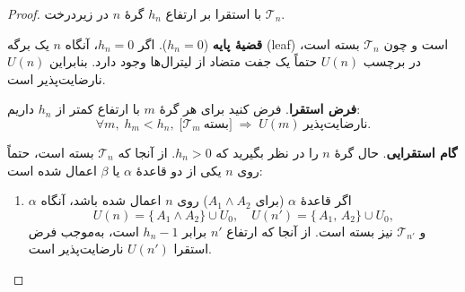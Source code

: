   \begin{proof}
  با استقرا بر ارتفاع \(h_n\) گرهٔ \(n\) در زیر‌درخت \(\mathscr{T}_n\).
  
  \textbf{قضیهٔ پایه} (\(h_n = 0\)).  
  اگر \(h_n=0\)، آنگاه \(n\) یک برگه (leaf) است و چون \(\mathscr{T}_n\) بسته است، در برچسب \(U(n)\) حتماً یک جفت متضاد از لیترال‌ها وجود دارد. بنابراین \(U(n)\) نارضایت‌پذیر است.
  
  \textbf{فرض استقرا}.  
  فرض کنید برای هر گرهٔ \(m\) با ارتفاع کمتر از \(h_n\) داریم:
  \[
  \forall m,\;h_m < h_n,\;\bigl[\mathscr{T}_m\ \text{بسته}\bigr]\;\Longrightarrow\;U(m)\ \text{نارضایت‌پذیر}.
  \]
  
  \textbf{گام استقرایی}.  
  حال گرهٔ \(n\) را در نظر بگیرید که \(h_n>0\). از آنجا که \(\mathscr{T}_n\) بسته است، حتماً روی \(n\) یکی از دو قاعدهٔ \(\alpha\) یا \(\beta\) اعمال شده است:
  \begin{center}
    \begin{latin}
    \hfill
    \end{latin}
  \end{center}
  \begin{enumerate}[1)]
    \item \(\alpha\)\;  
      اگر قاعدهٔ \(\alpha\) (برای \(A_1\land A_2\)) روی \(n\) اعمال شده باشد، آنگاه
      \[
        U(n)=\{\,A_1\land A_2\}\cup U_0,
        \quad
        U(n')=\{\,A_1,\,A_2\}\cup U_0,
      \]
      و \(\mathscr{T}_{n'}\) نیز بسته است. از آنجا که ارتفاع \(n'\) برابر \(h_n-1\) است، به‌موجب فرض استقرا \(U(n')\) نارضایت‌پذیر است.  

\end{enumerate}
\end{proof}
